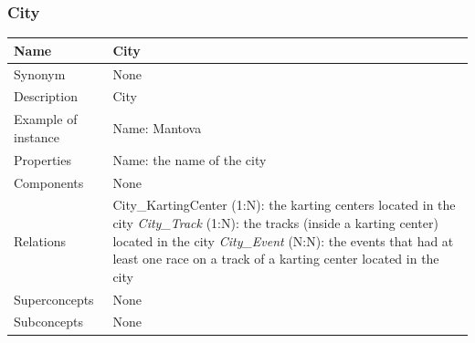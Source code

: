 \documentclass{beamer}
\begin{document}
\begin{frame}
\frametitle{City}
\begin{table}
\tiny
\begin{tabular}{|p{2cm}|p{6cm}|}
\hline
Name & \textbf{City} \\
\hline
Synonym & None \\
\hline
Description & City \\
\hline
Example of instance & 
Name: Mantova \\
\hline
Properties & 
Name: the name of the city \\
\hline
Components & None \\
\hline
Relations &
City\_KartingCenter (1:N): the karting centers located in the city \newline
\textit{City\_Track} (1:N): the tracks (inside a karting center) located in the city \newline
\textit{City\_Event} (N:N): the events that had at least one race on a track of a karting center
located in the city \\
\hline
Superconcepts & None \\
\hline
Subconcepts & None \\
\hline
\end{tabular}
\end{table}
\end{frame}
\end{document}
